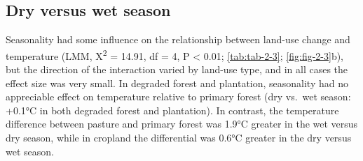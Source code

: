\documentclass[12pt,a4paper,]{report}
\theoremstyle{definition}
\theoremstyle{definition}
\theoremstyle{definition}
\theoremstyle{remark}
\begin{document}
\subsection{Dry versus wet season}\label{dry-versus-wet-season}

Seasonality had some influence on the relationship between land-use
change and temperature (LMM, Χ\textsuperscript{2} = 14.91, df = 4, P
\textless{} 0.01; \autoref{tab:tab-2-3}; \autoref{fig:fig-2-3}b), but
the direction of the interaction varied by land-use type, and in all
cases the effect size was very small. In degraded forest and plantation,
seasonality had no appreciable effect on temperature relative to primary
forest (dry vs.~wet season: +0.1°C in both degraded forest and
plantation). In contrast, the temperature difference between pasture and
primary forest was 1.9°C greater in the wet versus dry season, while in
cropland the differential was 0.6°C greater in the dry versus wet
season.
\end{document}
